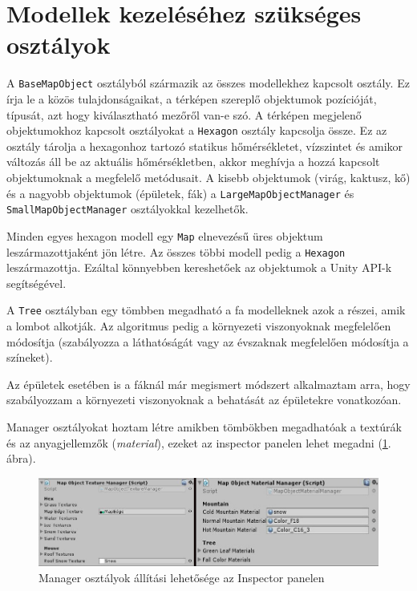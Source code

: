 \section{Modellek kezeléséhez szükséges osztályok}

A \texttt{BaseMapObject} osztályból származik az összes modellekhez kapcsolt osztály. Ez írja le a közös tulajdonságaikat, a térképen szereplő objektumok pozícióját, típusát, azt hogy kiválasztható mezőről van-e szó. A térképen megjelenő objektumokhoz kapcsolt osztályokat a \texttt{Hexagon} osztály kapcsolja össze. Ez az osztály tárolja  a hexagonhoz tartozó statikus hőmérsékletet, vízszintet és amikor változás áll be az aktuális hőmérsékletben, akkor meghívja a hozzá kapcsolt objektumoknak a megfelelő metódusait. A kisebb objektumok (virág, kaktusz, kő) és a nagyobb objektumok (épületek, fák) a \texttt{LargeMapObjectManager} és \texttt{SmallMapObjectManager} osztályokkal kezelhetők.

Minden egyes hexagon modell egy \texttt{Map} elnevezésű üres objektum leszármazottjaként jön létre. Az összes többi modell pedig a \texttt{Hexagon} leszármazottja. Ezáltal könnyebben kereshetőek az objektumok a Unity API-k segítségével.

A \texttt{Tree} osztályban egy tömbben megadható a fa modelleknek azok a részei, amik a lombot alkotják. Az algoritmus pedig a környezeti viszonyoknak megfelelően módosítja (szabályozza a láthatóságát vagy az évszaknak megfelelően módosítja a színeket).

Az épületek esetében is a fáknál már megismert módszert alkalmaztam arra, hogy szabályozzam a környezeti viszonyoknak a behatását az épületekre vonatkozóan.

Manager osztályokat hoztam létre amikben tömbökben megadhatóak a textúrák és az anyagjellemzők (\textit{material}), ezeket az inspector panelen lehet megadni (\ref{fig:Managers}. ábra).

\begin{figure}[h!]
\centering
\includegraphics[scale=0.45]{kepek/Managers.jpg}
\caption{Manager osztályok állítási lehetősége az Inspector panelen}
\label{fig:Managers}
\end{figure}

